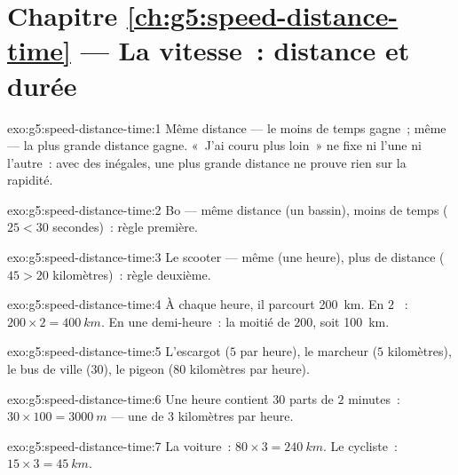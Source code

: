 \section*{Chapitre \ref{ch:g5:speed-distance-time} --- La vitesse~: distance et durée}

\begin{solution}{exo:g5:speed-distance-time:1}
Même distance --- le moins de temps gagne~; même  --- la plus
grande distance gagne. «~J'ai couru plus loin~» ne fixe ni l'une ni
l'autre~: avec des  inégales, une plus grande distance ne
prouve rien sur la rapidité.
\end{solution}

\begin{solution}{exo:g5:speed-distance-time:2}
Bo --- même distance (un bassin), moins de temps ($25 < 30$
secondes)~: règle première.
\end{solution}

\begin{solution}{exo:g5:speed-distance-time:3}
Le scooter --- même  (une heure), plus de distance ($45 > 20$
kilomètres)~: règle deuxième.
\end{solution}

\begin{solution}{exo:g5:speed-distance-time:4}
À chaque heure, il parcourt \qty{200}{km}. En $2$ ~:
$200 \times 2 = \qty{400}{km}$. En une demi-heure~: la moitié de
$200$, soit \qty{100}{km}.
\end{solution}

\begin{solution}{exo:g5:speed-distance-time:5}
L'escargot ($5$  par heure), le marcheur ($5$ kilomètres), le
bus de ville ($30$), le pigeon ($80$ kilomètres par heure).
\end{solution}

\begin{solution}{exo:g5:speed-distance-time:6}
Une heure contient $30$ parts de $2$ minutes~:
$30 \times 100 = \qty{3000}{m}$ --- une  de $3$ kilomètres par
heure.
\end{solution}

\begin{solution}{exo:g5:speed-distance-time:7}
La voiture~: $80 \times 3 = \qty{240}{km}$. Le cycliste~:
$15 \times 3 = \qty{45}{km}$.
\end{solution}

